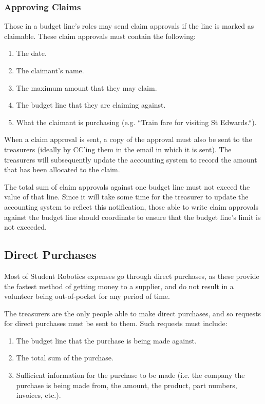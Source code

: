 \subsubsection{Approving Claims}

Those in a budget line's roles may send claim approvals if the line is marked as claimable.  These claim approvals must contain the following:
\begin{enumerate}
\item The date.
\item The claimant's name.
\item The maximum amount that they may claim.
\item The budget line that they are claiming against.
\item What the claimant is purchasing (e.g. ``Train fare for visiting St Edwards.``).
\end{enumerate}

When a claim approval is sent, a copy of the approval must also be sent to the treasurers (ideally by CC'ing them in the email in which it is sent).  The treasurers will subsequently update the accounting system to record the amount that has been allocated to the claim.

The total sum of claim approvals against one budget line must not exceed the value of that line.  Since it will take some time for the treasurer to update the accounting system to reflect this notification, those able to write claim approvals against the budget line should coordinate to ensure that the budget line's limit is not exceeded.

\subsection{Direct Purchases}
Most of Student Robotics expenses go through direct purchases, as these provide the fastest method of getting money to a supplier, and do not result in a volunteer being out-of-pocket for any period of time.

The treasurers are the only people able to make direct purchases, and so requests for direct purchases must be sent to them.  Such requests must include:
\begin{enumerate}
\item The budget line that the purchase is being made against.
\item The total sum of the purchase.
\item Sufficient information for the purchase to be made (i.e. the company the purchase is being made from, the amount, the product, part numbers, invoices, etc.).
\end{enumerate}

